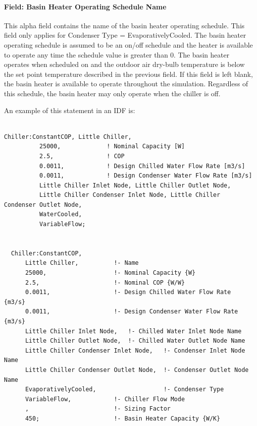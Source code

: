 \paragraph{Field: Basin Heater Operating Schedule Name}\label{field-basin-heater-operating-schedule-name-002}

This alpha field contains the name of the basin heater operating schedule. This field only applies for Condenser Type = EvaporativelyCooled. The basin heater operating schedule is assumed to be an on/off schedule and the heater is available to operate any time the schedule value is greater than 0. The basin heater operates when scheduled on and the outdoor air dry-bulb temperature is below the set point temperature described in the previous field. If this field is left blank, the basin heater is available to operate throughout the simulation. Regardless of this schedule, the basin heater may only operate when the chiller is off.

An example of this statement in an IDF is:

\begin{lstlisting}

Chiller:ConstantCOP, Little Chiller,
          25000,             ! Nominal Capacity [W]
          2.5,               ! COP
          0.0011,            ! Design Chilled Water Flow Rate [m3/s]
          0.0011,            ! Design Condenser Water Flow Rate [m3/s]
          Little Chiller Inlet Node, Little Chiller Outlet Node,
          Little Chiller Condenser Inlet Node, Little Chiller Condenser Outlet Node,
          WaterCooled,
          VariableFlow;


  Chiller:ConstantCOP,
      Little Chiller,          !- Name
      25000,                   !- Nominal Capacity {W}
      2.5,                     !- Nominal COP {W/W}
      0.0011,                  !- Design Chilled Water Flow Rate {m3/s}
      0.0011,                  !- Design Condenser Water Flow Rate {m3/s}
      Little Chiller Inlet Node,   !- Chilled Water Inlet Node Name
      Little Chiller Outlet Node,  !- Chilled Water Outlet Node Name
      Little Chiller Condenser Inlet Node,   !- Condenser Inlet Node Name
      Little Chiller Condenser Outlet Node,  !- Condenser Outlet Node Name
      EvaporativelyCooled,                   !- Condenser Type
      VariableFlow,            !- Chiller Flow Mode
      ,                        !- Sizing Factor
      450;                     !- Basin Heater Capacity {W/K}
\end{lstlisting}

